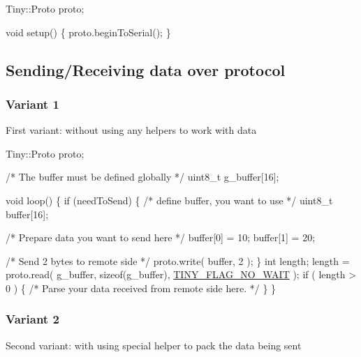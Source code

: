 \begin{DoxyCode}
Tiny::Proto proto;

\textcolor{keywordtype}{void} setup()
\{
    proto.beginToSerial();
\}
\end{DoxyCode}
\hypertarget{arduino_arduino_tiny_send}{}\subsection{Sending/\+Receiving data over protocol}\label{arduino_arduino_tiny_send}
\hypertarget{arduino_arduino_tiny_send_receive1}{}\subsubsection{Variant 1}\label{arduino_arduino_tiny_send_receive1}
First variant\+: without using any helpers to work with data 
\begin{DoxyCode}
Tiny::Proto proto;

\textcolor{comment}{/* The buffer must be defined globally */}
uint8\_t g\_buffer[16];

\textcolor{keywordtype}{void} loop()
\{
    \textcolor{keywordflow}{if} (needToSend)
    \{
        \textcolor{comment}{/* define buffer, you want to use */}
        uint8\_t buffer[16];

        \textcolor{comment}{/* Prepare data you want to send here */}
        buffer[0] = 10;
        buffer[1] = 20;

        \textcolor{comment}{/* Send 2 bytes to remote side */}
        proto.write( buffer, 2 );
    \}
    \textcolor{keywordtype}{int} length;
    length = proto.read( g\_buffer, \textcolor{keyword}{sizeof}(g\_buffer), \hyperlink{group__FLAGS__GROUP_gadadd60eb21d7949e6d097ad36aab9b2e}{TINY\_FLAG\_NO\_WAIT} );
    \textcolor{keywordflow}{if} ( length > 0 )
    \{
        \textcolor{comment}{/* Parse your data received from remote side here. */}
    \}
\}
\end{DoxyCode}
\hypertarget{arduino_arduino_tiny_send_receive2}{}\subsubsection{Variant 2}\label{arduino_arduino_tiny_send_receive2}
Second variant\+: with using special helper to pack the data being sent 
